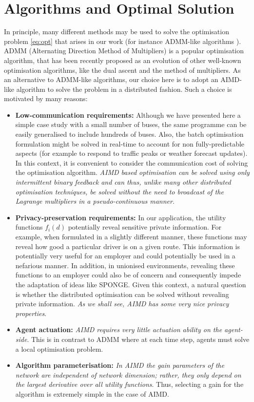 \documentclass[journal]{IEEEtran}
\begin{document}
\section{Algorithms and Optimal Solution}
\label{AIMD_Optimisation}


In principle, many different methods may be used to solve the optimisation problem \eqref{eq:opt} that arises in our work  (for instance ADMM-like algorithms \cite{boyd2011distributed}). ADMM (Alternating Direction Method of Multipliers) is a popular optimisation algorithm, that has been recently proposed as an evolution of other well-known optimisation algorithms, like the dual ascent and the method of multipliers. 
As an alternative to ADMM-like algorithms, our choice here is to adopt an AIMD-like algorithm \cite{wirth2014nonhomogeneous} to solve the problem in a distributed fashion. Such a choice is motivated by many reasons: 
\begin{itemize}
	\item
	\textbf{Low-communication requirements:} Although we have presented here a simple case study with a small number of buses, the same programme can be easily generalised to include hundreds of buses. Also, the batch optimisation formulation might be solved in real-time to account for non fully-predictable aspects (for example to respond to traffic peaks or weather forecast updates). In this context, it is convenient to consider the communication cost of solving the optimisation algorithm. {\em AIMD based optimisation can be solved using only intermittent binary feedback and can thus, unlike many other distributed optimisation techniques, be solved without the need to broadcast of the Lagrange multipliers in a pseudo-continuous manner}. \newline
	\item
	\textbf{Privacy-preservation requirements:} In our application, the utility functions $f_i(d)$ potentially reveal sensitive private information. For example, when formulated in a slightly different manner, these functions  may reveal how good a particular driver is on a given route. This information is potentially very useful for an employer and could potentially be used in a nefarious manner. In addition, in unionised environments, revealing these functions to an employer could also be of concern and consequently impede the adaptation of ideas like SPONGE. Given this context, a natural question is whether the distributed optimisation can be solved without revealing private information. {\em As we shall see, AIMD has some very nice privacy properties}. \newline
	\item
	\textbf{Agent actuation:}  {\em AIMD requires very little actuation ability on the agent-side}. This is in contrast to ADMM where at each time step, agents must solve a local optimisation problem.\newline
	\item
	\textbf{Algorithm parameterisation:} {\em In AIMD the gain parameters of the network are independent of network dimension; rather, they only depend on the largest derivative over all utility functions}. Thus, selecting a gain for the algorithm is extremely simple in the case of AIMD.
\end{itemize}
\end{document}
